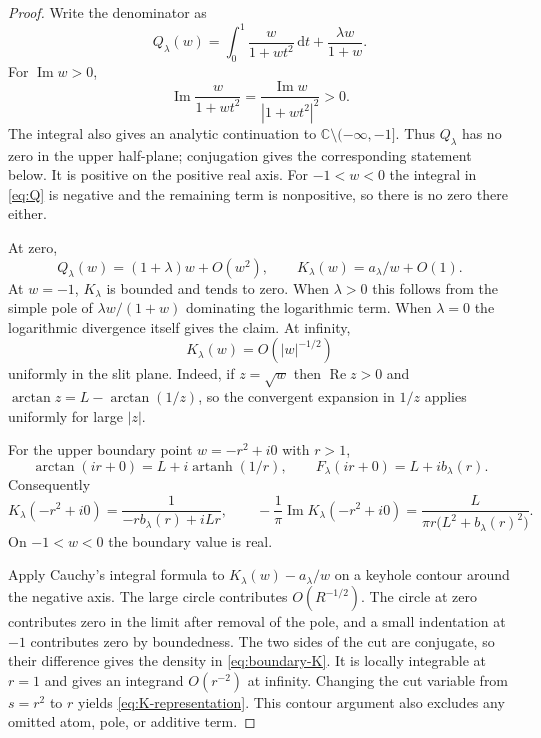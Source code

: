 \documentclass[11pt,a4paper]{article}
\theoremstyle{definition}\newtheorem{definition}[theorem]{Definition}
\theoremstyle{remark}\newtheorem{remark}[theorem]{Remark}
\newcommand{\dd}{\,\mathrm d}
\DeclareMathOperator{\artanh}{artanh}
\begin{document}
\begin{proof}
Write the denominator as
\begin{equation}\label{eq:Q}
 Q_\lambda(w)=\int_0^1\frac{w}{1+wt^2}\dd t
                     +\frac{\lambda w}{1+w}.
\end{equation}
For $\operatorname{Im}w>0$,
\[
 \operatorname{Im}\frac{w}{1+wt^2}
   =\frac{\operatorname{Im}w}{|1+wt^2|^2}>0.
\]
The integral also gives an analytic continuation to
$\mathbb C\setminus(-\infty,-1]$. Thus $Q_\lambda$ has no zero in the upper half-plane; conjugation
gives the corresponding statement below. It is positive on the
positive real axis. For $-1<w<0$ the integral in
\eqref{eq:Q} is negative and the remaining term is nonpositive,
so there is no zero there either.

At zero,
\[
 Q_\lambda(w)=(1+\lambda)w+O(w^2),\qquad
 K_\lambda(w)=a_\lambda/w+O(1).
\]
At $w=-1$, $K_\lambda$ is bounded and tends to zero. When
$\lambda>0$ this follows from the simple pole of
$\lambda w/(1+w)$ dominating the logarithmic term. When
$\lambda=0$ the logarithmic divergence itself gives the claim.
At infinity,
\[
 K_\lambda(w)=O(|w|^{-1/2})
\]
uniformly in the slit plane. Indeed, if $z=\sqrt w$ then
$\operatorname{Re}z>0$ and
$\arctan z=L-\arctan(1/z)$, so the convergent expansion in
$1/z$ applies uniformly for large $|z|$.

For the upper boundary point $w=-r^2+i0$ with $r>1$,
\[
 \arctan(ir+0)=L+i\artanh(1/r),\qquad
 F_\lambda(ir+0)=L+i b_\lambda(r).
\]
Consequently
\begin{equation}\label{eq:boundary-K}
 K_\lambda(-r^2+i0)
 =\frac1{-r b_\lambda(r)+iLr},\qquad
 -\frac1\pi\operatorname{Im}K_\lambda(-r^2+i0)
 =\frac{L}{\pi r\bigl(L^2+b_\lambda(r)^2\bigr)}.
\end{equation}
On $-1<w<0$ the boundary value is real.

Apply Cauchy's integral formula to
$K_\lambda(w)-a_\lambda/w$ on a keyhole contour around the
negative axis. The large circle contributes $O(R^{-1/2})$.
The circle at zero contributes zero in the limit after removal of
the pole, and a small indentation at $-1$ contributes zero by
boundedness. The two sides of the cut are conjugate, so their
difference gives the density in \eqref{eq:boundary-K}.
It is locally integrable at $r=1$ and gives an integrand
$O(r^{-2})$ at infinity. Changing the cut variable from $s=r^2$
to $r$ yields \eqref{eq:K-representation}. This contour argument
also excludes any omitted atom, pole, or additive term.
\end{proof}
\end{document}
